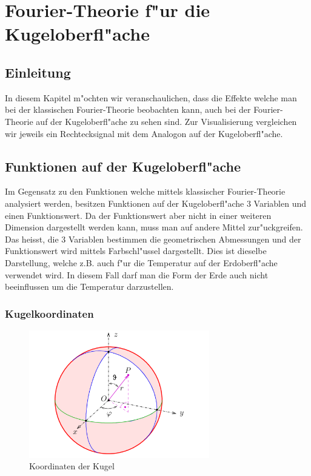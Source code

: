 \chapter{Fourier-Theorie f"ur die Kugeloberfl"ache
\label{chapter:kugel}}
\begin{refsection}

\section{Einleitung}

In diesem Kapitel m"ochten wir veranschaulichen, dass die Effekte 
welche man bei der klassischen Fourier-Theorie beobachten kann, 
auch bei der Fourier-Theorie auf der Kugeloberfl"ache zu sehen sind.
Zur Visualisierung vergleichen wir jeweils ein Rechtecksignal mit 
dem Analogon auf der Kugeloberfl"ache.

\section{Funktionen auf der Kugeloberfl"ache}
Im Gegensatz zu den Funktionen welche mittels klassischer 
Fourier-Theorie analysiert werden, besitzen Funktionen auf der 
Kugeloberfl"ache 3 Variablen und einen Funktionswert. 
Da der Funktionswert aber nicht in einer weiteren Dimension 
dargestellt werden kann, muss man auf andere Mittel zur"uckgreifen. 
Das heisst, die 3 Variablen bestimmen die geometrischen Abmessungen 
und der Funktionswert wird mittels Farbschl"ussel dargestellt. 
Dies ist dieselbe Darstellung, welche z.B. auch f"ur die Temperatur 
auf der Erdoberfl"ache verwendet wird. In diesem Fall darf man die 
Form der Erde auch nicht beeinflussen um die Temperatur darzustellen.
\subsection{Kugelkoordinaten}
\begin{figure}%
\centering
\includegraphics[width=0.7\textwidth]{kugel/Kugelkoord.pdf}
\caption{Koordinaten der Kugel
\label{skript:Koordinaten der Kugel}}
\end{figure}


\end{refsection}

